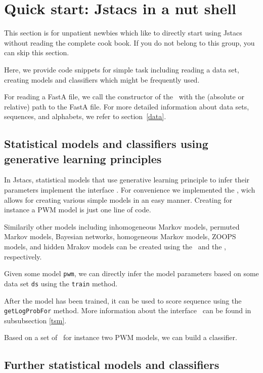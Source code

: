 \section{Quick start: Jstacs in a nut shell}
\renewcommand{\codefile}{recipes/TrainPWM.java}
This section is for unpatient newbies which like to directly start using Jstacs without reading the complete cook book. If you do not belong to this group, you can skip this section.

Here, we provide code snippets for simple task including reading a data set, creating models and classifiers which might be frequently used.

For reading a FastA file, we call the constructor of the \DNADataSet~with the (absolute or relative) path to the FastA file.
\setcounter{off}{19}
For more detailed information about data sets, sequences, and alphabets, we refer to section~\ref{data}.

\subsection{Statistical models and classifiers using generative learning principles}

In Jstacs, statistical models that use generative learning principle to infer their parameters implement the interface \TrainSM. For convenience we implemented the \TrainSMFactory, wich allows for creating various simple models in an easy manner. Creating for instance a PWM model is just one line of code.
\addtocounter{off}{2}
Similarily other models including inhomogeneous Markov models, permuted Markov models, Bayesian networks, homogeneous Markov models, ZOOPS models, and hidden Mrakov models can be created using the \TrainSMFactory~and the \HMMFactory, respectively.

Given some model \lstinline+pwm+, we can directly infer the model parameters based on some data set \lstinline+ds+ using the \lstinline+train+ method.
\addtocounter{off}{2}
After the model has been trained, it can be used to score sequence using the \lstinline+getLogProbFor+ method. More information about the interface \TrainSM~can be found in subsubsection \ref{tsm}.

Based on a set of \TrainSM~for instance two PWM models, we can build a classifier.
\renewcommand{\codefile}{\defaultcodefile}
\setcounter{off}{554}

\subsection{Further statistical models and classifiers}

